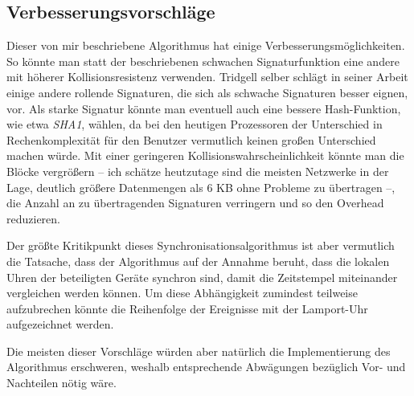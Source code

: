 \subsection{Verbesserungsvorschläge}
\label{sec:verbesserung}

Dieser von mir beschriebene Algorithmus hat einige Verbesserungsmöglichkeiten. So könnte man statt der beschriebenen schwachen Signaturfunktion eine andere
mit höherer Kollisionsresistenz verwenden. Tridgell selber schlägt in seiner Arbeit einige andere rollende Signaturen, die sich als schwache Signaturen
besser eignen, vor\cite{Tridgell99}. Als starke Signatur könnte man eventuell auch eine bessere Hash-Funktion, wie etwa \textit{SHA1}, wählen, da bei
den heutigen Prozessoren der Unterschied in Rechenkomplexität für den Benutzer vermutlich keinen großen Unterschied machen würde.
Mit einer geringeren Kollisionswahrscheinlichkeit könnte man die Blöcke vergrößern -- ich schätze heutzutage sind die meisten Netzwerke in der Lage,
deutlich größere Datenmengen als 6 KB ohne Probleme zu übertragen --, die Anzahl an zu übertragenden Signaturen verringern und so den Overhead reduzieren.

Der größte Kritikpunkt dieses Synchronisationsalgorithmus ist aber vermutlich die Tatsache, dass der Algorithmus auf der Annahme beruht, dass
die lokalen Uhren der beteiligten Geräte synchron sind, damit die Zeitstempel miteinander vergleichen werden können. 
Um diese Abhängigkeit zumindest teilweise aufzubrechen könnte die Reihenfolge der Ereignisse mit der Lamport-Uhr\cite{Lamport78} aufgezeichnet werden.

Die meisten dieser Vorschläge würden aber natürlich die Implementierung des Algorithmus erschweren, weshalb entsprechende Abwägungen bezüglich
Vor- und Nachteilen nötig wäre.
